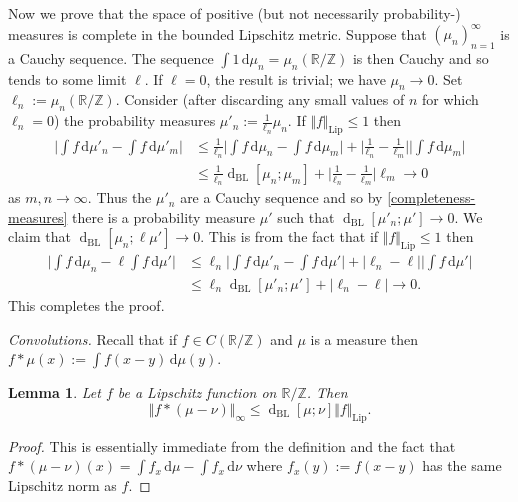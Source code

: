 \documentclass[11pt,reqno]{amsart}
\numberwithin{equation}{section}
\newtheorem{lemma}[theorem]{Lemma}
\theoremstyle{definition}
\theoremstyle{remark}
\newcommand{\dist}[2]{{\operatorname{d}_{\operatorname{BL}}[#1;#2]}}
\renewcommand{\le}{\leqslant}
\newcommand\Z{\mathbb{Z}}
\newcommand\R{\mathbb{R}}
\newcommand\Lip{\operatorname{Lip}}
\begin{document}
Now we prove that the space of positive (but not necessarily probability-) measures is complete in the bounded Lipschitz metric. Suppose that $(\mu_n)_{n = 1}^{\infty}$ is a Cauchy sequence. The sequence $\int 1 \, \mathrm{d}\mu_n = \mu_n(\R/\Z)$ is then Cauchy and so tends to some limit $\ell$. If $\ell = 0$, the result is trivial; we have $\mu_n \rightarrow 0$. Set $\ell_n := \mu_n(\R/\Z)$. Consider (after discarding any small values of $n$ for which $\ell_n = 0$) the probability measures $\mu'_n := \frac{1}{\ell_n} \mu_n$.
If $\Vert f \Vert_{\Lip} \le 1$ then 
\begin{align*}
\Big| \int f \, \mathrm{d}\mu'_n - \int f \, \mathrm{d}\mu'_m \Big| & \le \frac{1}{\ell_n}\Big| \int f \, \mathrm{d}\mu_n - \int f \, \mathrm{d}\mu_m\Big| + \Big| \frac{1}{\ell_n} - \frac{1}{\ell_m}\Big| \Big| \int f \, \mathrm{d}\mu_m\Big| \\ & \le \frac{1}{\ell_n} \dist{\mu_n}{\mu_m} + \Big| \frac{1}{\ell_n} - \frac{1}{\ell_m} \Big|\ell_m \rightarrow 0
\end{align*}
as $m,n \rightarrow \infty$. Thus the $\mu'_n$ are a Cauchy sequence and so by \cref{completeness-measures} there is a probability measure $\mu'$ such that $\dist{\mu'_n}{\mu'} \rightarrow 0$. We claim that $\dist{\mu_n}{\ell \mu'} \rightarrow 0$. This is from the fact that if $\Vert f \Vert_{\Lip} \le 1$ then 
\begin{align*}
\Big| \int f \, \mathrm{d}\mu_n - \ell \int f \, \mathrm{d}\mu'\Big| & \le \ell_n \Big| \int f \, \mathrm{d}\mu'_n - \int f \, \mathrm{d}\mu'\Big| + |\ell_n - \ell| \Big| \int f \, \mathrm{d}\mu' \Big| \\ & \le \ell_n \dist{\mu'_n}{\mu'} + |\ell_n - \ell| \rightarrow 0.
\end{align*}
This completes the proof. \vspace*{8pt}

\emph{Convolutions.} Recall that if $f \in C(\R/\Z)$ and $\mu$ is a measure then $f \ast \mu(x) := \int f(x - y) \, \mathrm{d} \mu(y)$.

\begin{lemma}\label{simple-lip-conv}
Let $f$ be a Lipschitz function on $\R/\Z$. Then 
\[ \Vert f \ast (\mu - \nu) \Vert_{\infty} \le \dist{\mu}{\nu} \Vert f \Vert_{\Lip}.\]
\end{lemma}
\begin{proof}
This is essentially immediate from the definition and the fact that $f \ast (\mu - \nu)(x) = \int f_x \, \mathrm{d}\mu - \int f_x \, \mathrm{d}\nu$ where $f_x(y) := f(x - y)$ has the same Lipschitz norm as $f$.
\end{proof}
\end{document}
